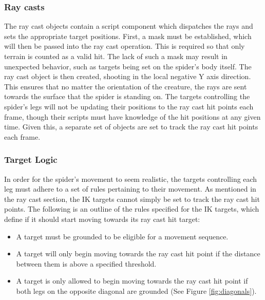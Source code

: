 \subsubsection{Ray casts}
The ray cast objects contain a script component which dispatches the rays and
sets the appropriate target positions. First, a mask must be established, which
will then be passed into the ray cast operation. This is required so that only
terrain is counted as a valid hit. The lack of such a mask may result in
unexpected behavior, such as targets being set on the spider's body itself. The
ray cast object is then created, shooting in the local negative Y axis
direction. This ensures that no matter the orientation of the creature, the rays
are sent towards the surface that the spider is standing on. The targets
controlling the spider's legs will not be updating their positions to the
ray cast hit points each frame, though their scripts must have knowledge of the
hit positions at any given time. Given this, a separate set of objects are set
to track the ray cast hit points each frame.

\subsubsection{Target Logic}
In order for the spider's movement to seem realistic, the targets controlling
each leg must adhere to a set of rules pertaining to their movement. As
mentioned in the ray cast section, the IK targets cannot simply be set to track
the ray cast hit points. The following is an outline of the rules specified for
the IK targets, which define if it should start moving towards its ray cast hit
target:
\begin{itemize}
    \item A target must be grounded to be eligible for a movement sequence.

    \item A target will only begin moving towards the ray cast hit point if the
        distance between them is above a specified threshold.

    \item A target is only allowed to begin moving towards the ray cast hit
        point if both legs on the opposite diagonal are grounded (See Figure
        \ref{fig:diagonals}).
\end{itemize}


